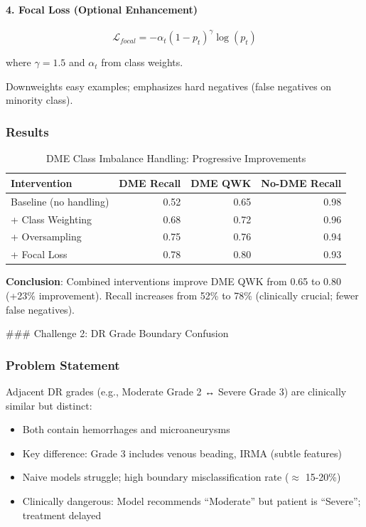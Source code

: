 \documentclass[12pt,a4paper]{article}
\begin{document}
\paragraph{4. Focal Loss (Optional Enhancement)}

\begin{equation}
\mathcal{L}_{focal} = -\alpha_t (1 - p_t)^\gamma \log(p_t)
\end{equation}

where $\gamma = 1.5$ and $\alpha_t$ from class weights.

Downweights easy examples; emphasizes hard negatives (false negatives on minority class).

\subsubsection{Results}

\begin{table}[H]
\centering
\small
\caption{DME Class Imbalance Handling: Progressive Improvements}
\begin{tabular}{|l|r|r|r|}
\hline
\textbf{Intervention} & \textbf{DME Recall} & \textbf{DME QWK} & \textbf{No-DME Recall} \\
\hline
Baseline (no handling) & 0.52 & 0.65 & 0.98 \\
+ Class Weighting & 0.68 & 0.72 & 0.96 \\
+ Oversampling & 0.75 & 0.76 & 0.94 \\
+ Focal Loss & 0.78 & 0.80 & 0.93 \\
\hline
\end{tabular}
\end{table}

\textbf{Conclusion}: Combined interventions improve DME QWK from 0.65 to 0.80 (+23\% improvement). Recall increases from 52\% to 78\% (clinically crucial; fewer false negatives).

### Challenge 2: DR Grade Boundary Confusion

\subsubsection{Problem Statement}

Adjacent DR grades (e.g., Moderate Grade 2 ↔ Severe Grade 3) are clinically similar but distinct:

\begin{itemize}
    \item Both contain hemorrhages and microaneurysms
    \item Key difference: Grade 3 includes venous beading, IRMA (subtle features)
    \item Naive models struggle; high boundary misclassification rate ($\approx$ 15-20\%)
    \item Clinically dangerous: Model recommends ``Moderate'' but patient is ``Severe''; treatment delayed
\end{itemize}
\end{document}
